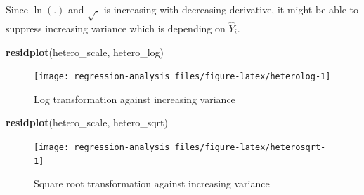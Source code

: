 \documentclass[]{book}
\newenvironment{Shaded}{\begin{snugshade}}{\end{snugshade}}
\newcommand{\CommentTok}[1]{\textcolor[rgb]{0.56,0.35,0.01}{\textit{#1}}}
\newcommand{\DataTypeTok}[1]{\textcolor[rgb]{0.13,0.29,0.53}{#1}}
\newcommand{\FloatTok}[1]{\textcolor[rgb]{0.00,0.00,0.81}{#1}}
\newcommand{\KeywordTok}[1]{\textcolor[rgb]{0.13,0.29,0.53}{\textbf{#1}}}
\newcommand{\NormalTok}[1]{#1}
\newcommand{\OperatorTok}[1]{\textcolor[rgb]{0.81,0.36,0.00}{\textbf{#1}}}
\newcommand{\StringTok}[1]{\textcolor[rgb]{0.31,0.60,0.02}{#1}}
\theoremstyle{definition}
\theoremstyle{definition}
\theoremstyle{definition}
\theoremstyle{remark}
\begin{document}
Since \(\ln(.)\) and \(\sqrt{.}\) is increasing with decreasing derivative, it might be able to suppress increasing variance which is depending on \(\hat{Y}_i\).

\begin{Shaded}
\end{Shaded}

\begin{Shaded}
\begin{Highlighting}[]
\KeywordTok{residplot}\NormalTok{(hetero_scale, hetero_log)}
\end{Highlighting}
\end{Shaded}

\begin{figure}[H]

{\centering \texttt{[image: regression-analysis\_files/figure-latex/heterolog-1]} 

}

\caption{Log transformation against increasing variance}\label{fig:heterolog}
\end{figure}

\begin{Shaded}
\begin{Highlighting}[]
\KeywordTok{residplot}\NormalTok{(hetero_scale, hetero_sqrt)}
\end{Highlighting}
\end{Shaded}

\begin{figure}[H]

{\centering \texttt{[image: regression-analysis\_files/figure-latex/heterosqrt-1]} 

}

\caption{Square root transformation against increasing variance}\label{fig:heterosqrt}
\end{figure}
\end{document}
